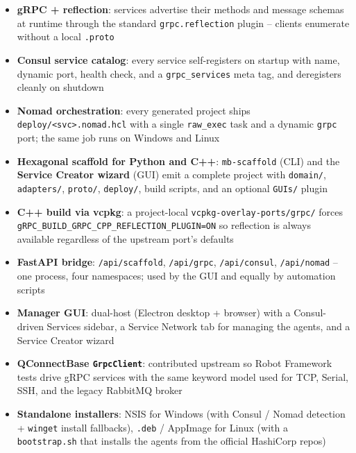 \begin{itemize}
   \item \textbf{gRPC + reflection}: services advertise their methods and message
         schemas at runtime through the standard \texttt{grpc.reflection} plugin --
         clients enumerate without a local \texttt{.proto}
   \item \textbf{Consul service catalog}: every service self-registers on startup with
         name, dynamic port, health check, and a \texttt{grpc\_services} meta tag, and
         deregisters cleanly on shutdown
   \item \textbf{Nomad orchestration}: every generated project ships
         \texttt{deploy/<svc>.nomad.hcl} with a single \texttt{raw\_exec} task and a
         dynamic \texttt{grpc} port; the same job runs on Windows and Linux
   \item \textbf{Hexagonal scaffold for Python and C++}: \texttt{mb-scaffold} (CLI) and
         the \textbf{Service Creator wizard} (GUI) emit a complete project with
         \texttt{domain/}, \texttt{adapters/}, \texttt{proto/}, \texttt{deploy/}, build
         scripts, and an optional \texttt{GUIs/} plugin
   \item \textbf{C++ build via vcpkg}: a project-local
         \texttt{vcpkg-overlay-ports/grpc/} forces
         \texttt{gRPC\_BUILD\_GRPC\_CPP\_REFLECTION\_PLUGIN=ON} so reflection is always
         available regardless of the upstream port's defaults
   \item \textbf{FastAPI bridge}: \texttt{/api/scaffold}, \texttt{/api/grpc},
         \texttt{/api/consul}, \texttt{/api/nomad} -- one process, four namespaces;
         used by the GUI and equally by automation scripts
   \item \textbf{Manager GUI}: dual-host (Electron desktop + browser) with a
         Consul-driven Services sidebar, a Service Network tab for managing the agents,
         and a Service Creator wizard
   \item \textbf{QConnectBase \texttt{GrpcClient}}: contributed upstream so Robot
         Framework tests drive gRPC services with the same keyword model used for TCP,
         Serial, SSH, and the legacy RabbitMQ broker
   \item \textbf{Standalone installers}: NSIS for Windows (with Consul / Nomad detection
         + \texttt{winget} install fallbacks), \texttt{.deb} / AppImage for Linux (with
         a \texttt{bootstrap.sh} that installs the agents from the official HashiCorp
         repos)
\end{itemize}

